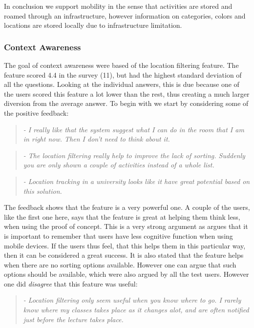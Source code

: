 In conclusion we support mobility in the sense that activities are stored and roamed through an infrastructure, however information on categories, colors and locations are stored locally due to infrastructure limitation.

\subsubsection{Context Awareness}
The goal of context awareness were based of the location filtering feature. The feature scored 4.4 in the survey (11), but had the highest standard deviation of all the questions. Looking at the individual answers, this is due because one of the users scored this feature a lot lower than the rest, thus creating a much larger diversion from the average answer.
To begin with we start by considering some of the positive feedback:

\begin{quotation}
	\emph{
		- I really like that the system suggest what I can do in the room that I am in right now. Then I don't need to think about it.
	}
\end{quotation}

\begin{quotation}
	\emph{
		- The location filtering really help to improve the lack of sorting. Suddenly you are only shown a couple of activities instead of a whole list.
	}
\end{quotation}

\begin{quotation}
	\emph{
		- Location tracking in a university looks like it have great potential based on this solution.
	}
\end{quotation}

The feedback shows that the feature is a very powerful one. A couple of the users, like the first one here, says that the feature is great at helping them think less, when using the proof of concept. This is a very strong argument as \citet{ugur2001} argues that it is important to remember that users have less cognitive function when using mobile devices. If the users thus feel, that this helps them in this particular way, then it can be considered a great success. It is also stated that the feature helps when there are no sorting options available. However one can argue that such options should be available, which were also argued by all the test users. However one did \emph{disagree} that this feature was useful:

\begin{quotation}
	\emph{
		- Location filtering only seem useful when you know where to go. I rarely know where my classes takes place as it changes alot, and are often notified just before the lecture takes place.	
	}
\end{quotation}

